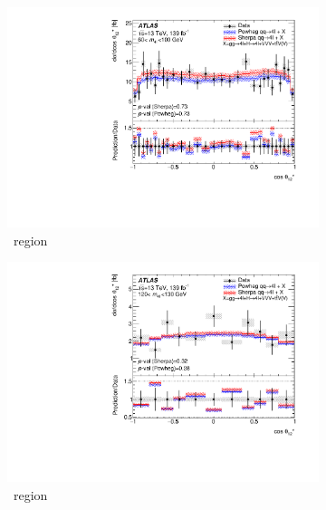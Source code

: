 \begin{figure}[htb!]
    \begin{subfigure}{.49\textwidth}\centering
      \includegraphics[width=.99\linewidth]{Figures/m4l/UnfoldedResults/linY_Unfolded_Data_cosThetaStar1_m4l60-100.pdf}\caption{\ZFourL \ region}\label{fig:sub-first}
    \end{subfigure}
    \begin{subfigure}{.49\textwidth}\centering
      \includegraphics[width=.99\linewidth]{Figures/m4l/UnfoldedResults/linY_Unfolded_Data_cosThetaStar1_m4l120-130.pdf} \caption{\HFourL \ region}\label{fig:sub-second}
    \end{subfigure}
    \begin{subfigure}{.49\textwidth}\centering

\end{subfigure}
\end{figure}
